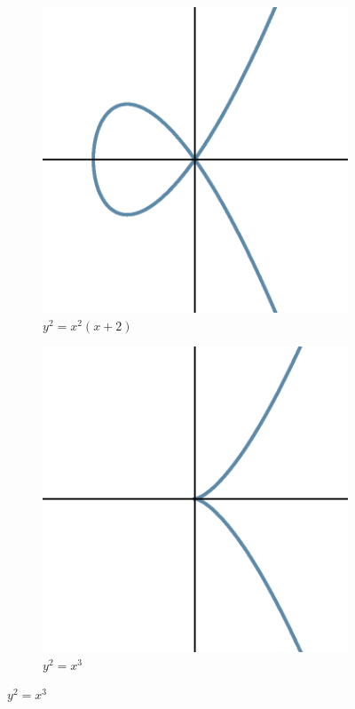\begin{frame}[plain]
	\begin{figure}
	\centering
	\begin{subfigure}{0.45\textwidth}
	\includegraphics[width=\textwidth]{images/ec3.eps}
	\caption*{$y^2=x^2(x+2)$}
	\end{subfigure}
	\begin{subfigure}{0.45\textwidth}
	\includegraphics[width=\textwidth]{images/ec4.eps}
	\caption*{$y^2= x^3$}
	\end{subfigure}
	\end{figure}
\end{frame}





